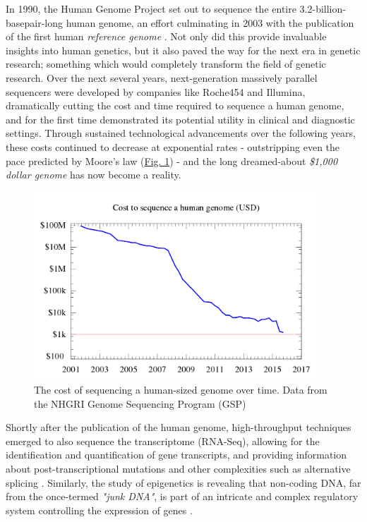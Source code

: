 In 1990, the Human Genome Project \cite{olson1993human} set out to sequence the entire 3.2-billion-basepair-long human genome, an effort culminating in 2003 with the publication of the first human \textit{reference genome} \cite{international2004finishing}. Not only did this provide invaluable insights into human genetics, but it also paved the way for the next era in genetic research; something which would completely transform the field of genetic research. Over the next several years, next-generation massively parallel sequencers were developed by companies like Roche454 and Illumina, dramatically cutting the cost and time required to sequence a human genome, and for the first time demonstrated its potential utility in clinical and diagnostic settings. Through sustained technological advancements over the following years, these costs continued to decrease at exponential rates - outstripping even the pace predicted by Moore's law (\hyperref[fig:seqcost]{Fig. \ref{fig:seqcost}}) - and the long dreamed-about \textit{\$1,000 dollar genome} \cite{thousanddollargenome} \cite{sequencingcostsNHGRI} has now become a reality.

\begin{figure}[h!]
    \centering
    \includegraphics[width=300pt]{chapters/images/Historic_cost_of_sequencing_a_human_genome.png}
    \caption{The cost of sequencing a human-sized genome over time. Data from the NHGRI Genome Sequencing Program (GSP) }
    \label{fig:seqcost}
\end{figure}

Shortly after the publication of the human genome, high-throughput techniques emerged to also sequence the transcriptome (RNA-Seq), allowing for the identification and quantification of gene transcripts, and providing information about post-transcriptional mutations and other complexities such as alternative splicing \cite{wang2009rna}. Similarly, the study of epigenetics is revealing that non-coding DNA, far from the once-termed \textit{"junk DNA"}, is part of an intricate and complex regulatory system controlling the expression of genes \cite{zuckerkandl2007combinatorial}.

